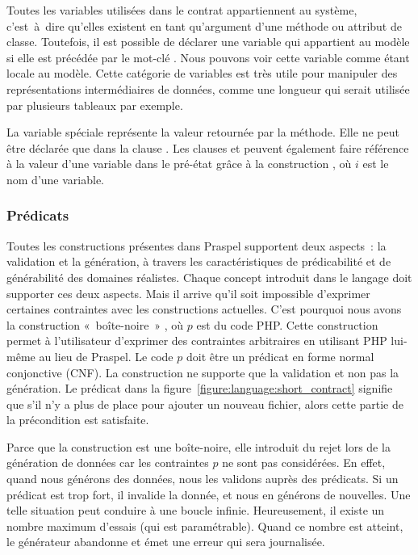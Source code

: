 Toutes les variables utilisées dans le contrat appartiennent au système,
c'est~à~dire qu'elles existent en tant qu'argument d'une méthode ou attribut de
classe. Toutefois, il est possible de déclarer une variable qui appartient au
modèle si elle est précédée par le mot-clé . Nous pouvons voir cette
variable comme étant {\strong locale} au modèle. Cette catégorie de variables
est très utile pour manipuler des représentations intermédiaires de données,
comme une longueur qui serait utilisée par plusieurs tableaux par exemple.

La variable spéciale \aresult représente la valeur {\strong retournée} par la
méthode. Elle ne peut être déclarée que dans la clause \aensures. Les clauses
\aensures et \athrowable peuvent également faire {\strong référence} à la valeur
d'une variable dans le pré-état grâce à la construction , où $i$ est le
nom d'une variable.

\subsubsection{Prédicats}

Toutes les constructions présentes dans Praspel supportent deux aspects~: la
validation et la génération, à travers les caractéristiques de prédicabilité et
de générabilité des domaines réalistes. Chaque concept introduit dans le langage
doit supporter ces deux aspects. Mais il arrive qu'il soit impossible d'exprimer
certaines contraintes avec les constructions actuelles. C'est pourquoi nous
avons la construction «~boîte-noire~» , où $p$ est du code PHP. Cette
construction permet à l'utilisateur d'exprimer des contraintes arbitraires en
utilisant PHP lui-même au lieu de Praspel. Le code $p$ doit être un prédicat en
forme normal {\strong conjonctive} (CNF). La construction  ne supporte
que la validation et non pas la génération. Le prédicat
 dans la figure~\ref{figure:language:short_contract} signifie
que s'il n'y a plus de place pour ajouter un nouveau fichier, alors cette partie
de la précondition est satisfaite.

Parce que la construction  est une boîte-noire, elle introduit du rejet
lors de la génération de données car les contraintes $p$ ne sont pas
considérées. En effet, quand nous générons des données, nous les validons auprès
des prédicats. Si un prédicat est trop fort, il invalide la donnée, et nous en
générons de nouvelles. Une telle situation peut conduire à une boucle infinie.
Heureusement, il existe un nombre maximum d'essais (qui est paramétrable). Quand
ce nombre est atteint, le générateur abandonne et émet une erreur qui sera
journalisée.

